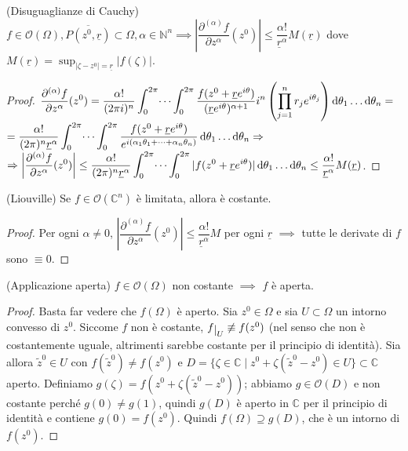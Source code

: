 \begin{prop}
  (Disuguaglianze di Cauchy) $f \in \mathcal{O}(\Omega), \overline{P(z^0, \underline{r})} \subset \Omega, \alpha \in \mathbb{N}^n \implies \left|\dfrac{\partial^{(\alpha)} f}{\partial z^\alpha}(z^0)\right| \le \dfrac{\alpha!}{\underline{r}^\alpha}M(\underline{r})$ dove $\displaystyle M(\underline{r})=\sup_{|\zeta-z^0|=\underline{r}} |f(\zeta)|$.
\end{prop}

\begin{proof}
  $\displaystyle \dfrac{\partial^{(\alpha)} f}{\partial z^\alpha}(z^0)=\dfrac{\alpha!}{(2\pi i)^n} \int_0^{2\pi} \dots \int_0^{2\pi} \frac{f(z^0+\underline{r}e^{i\theta})}{(\underline{r}e^{i\theta})^{\alpha+1}}i^n\left(\prod_{j=1}^n r_je^{i\theta_j}\right)\mathop{}\!\mathrm{d}\theta_1\dots\mathop{}\!\mathrm{d}\theta_n=$\\
  $\displaystyle =\frac{\alpha!}{(2\pi)^n\underline{r}^\alpha}\int_0^{2\pi} \dots \int_0^{2\pi} \frac{f(z^0+\underline{r}e^{i\theta})}{e^{i(\alpha_1\theta_1+\dots+\alpha_n\theta_n)}}\mathop{}\!\mathrm{d}\theta_1\dots\mathop{}\!\mathrm{d}\theta_n \Rightarrow$ \\
  $\displaystyle \Rightarrow \left|\dfrac{\partial^{(\alpha)} f}{\partial z^\alpha}(z^0)\right| \le \frac{\alpha!}{(2\pi)^n\underline{r}^\alpha}\int_0^{2\pi} \dots \int_0^{2\pi} |f(z^0+\underline{r}e^{i\theta})|\mathop{}\!\mathrm{d}\theta_1\dots\mathop{}\!\mathrm{d}\theta_n \le \dfrac{\alpha!}{\underline{r}^\alpha}M(\underline{r})$.
\end{proof}

\begin{cor}
  (Liouville) Se $f \in \mathcal{O}(\mathbb{C}^n)$ è limitata, allora è costante.
\end{cor}

\begin{proof}
  Per ogni $\alpha \not=0$, $\left|\dfrac{\partial^{(\alpha)} f}{\partial z^\alpha}(z^0)\right| \le \dfrac{\alpha!}{\underline{r}^\alpha}M$ per ogni $\underline{r}$ $\implies$ tutte le derivate di $f$ sono $\equiv 0$.
\end{proof}

\begin{thm}
  (Applicazione aperta) $f \in \mathcal{O}(\Omega)$ non costante $\implies$ $f$ è aperta.
\end{thm}

\begin{proof}
  Basta far vedere che $f(\Omega)$ è aperto. Sia $z^0 \in \Omega$ e sia $U \subset \Omega$ un intorno convesso di $z^0$. Siccome $f$ non è costante, $f\restrict{U} \not\equiv f(z^0)$ (nel senso che non è costantemente uguale, altrimenti sarebbe costante per il principio di identità).
  Sia allora $\tilde{z}^0 \in U$ con $f(\tilde{z}^0)\not=f(z^0)$ e $D=\{\zeta \in \mathbb{C} \mid z^0+\zeta(\tilde{z}^0-z^0) \in U\} \subset \mathbb{C}$ aperto.
  Definiamo $g(\zeta)=f(z^0+\zeta(\tilde{z}^0-z^0))$; abbiamo $g \in \mathcal{O}(D)$ e non costante perché $g(0)\not=g(1)$, quindi $g(D)$ è aperto in $\mathbb{C}$ per il principio di identità e contiene $g(0)=f(z^0)$. Quindi $f(\Omega) \supseteq g(D)$, che è un intorno di $f(z^0)$.
\end{proof}

